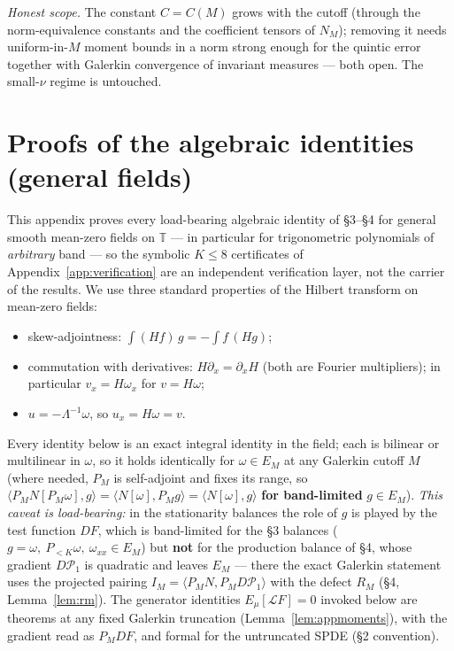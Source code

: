 \documentclass[11pt]{article}
\theoremstyle{remark}
\theoremstyle{plain}
\begin{document}
\emph{Honest scope.} The constant $C = C(M)$ grows with the cutoff (through the norm-equivalence
constants and the coefficient tensors of $N_M$); removing it needs uniform-in-$M$ moment bounds in a
norm strong enough for the quintic error together with Galerkin convergence of invariant measures ---
both open. The small-$\nu$ regime is untouched.

\section{Proofs of the algebraic identities (general fields)}
\label{app:identities}

This appendix proves every load-bearing algebraic identity of \S3--\S4 for general
smooth mean-zero fields on $\mathbb{T}$ --- in particular for trigonometric polynomials
of \emph{arbitrary} band --- so the symbolic $K \le 8$ certificates of Appendix~\ref{app:verification} are an
independent verification layer, not the carrier of the results. We use three standard
properties of the Hilbert transform on mean-zero fields:
\begin{itemize}
\item[(H1)] skew-adjointness: $\int (Hf)\,g = -\int f\,(Hg)$;
\item[(H2)] commutation with derivatives: $H\partial_x = \partial_x H$ (both are Fourier
multipliers); in particular $v_x = H\omega_x$ for $v = H\omega$;
\item[(H3)] $u = -\Lambda^{-1}\omega$, so $u_x = H\omega = v$.
\end{itemize}
Every identity below is an exact integral identity in the field; each is bilinear or
multilinear in $\omega$, so it holds identically for $\omega \in E_M$ at any Galerkin cutoff
$M$ (where needed, $P_M$ is self-adjoint and fixes its range, so
$\langle P_M N[P_M\omega], g\rangle = \langle N[\omega], P_M g\rangle = \langle N[\omega], g\rangle$
\textbf{for band-limited} $g \in E_M$). \emph{This caveat is load-bearing:} in the
stationarity balances the role of $g$ is played by the test function $DF$, which is
band-limited for the \S3 balances ($g = \omega,\ P_{<K}\omega,\ \omega_{xx} \in E_M$)
but \textbf{not} for the production balance of \S4, whose gradient $D\mathcal{P}_1$ is
quadratic and leaves $E_M$ --- there the exact Galerkin statement uses the projected
pairing $I_M = \langle P_M N, P_M D\mathcal{P}_1\rangle$ with the defect $R_M$
(\S4, Lemma~\ref{lem:rm}). The generator identities $E_\mu[\mathcal{L}F] = 0$ invoked below
are theorems at any fixed Galerkin truncation (Lemma~\ref{lem:appmoments}), with the
gradient read as $P_M DF$, and formal for the untruncated SPDE (\S2 convention).
\end{document}
